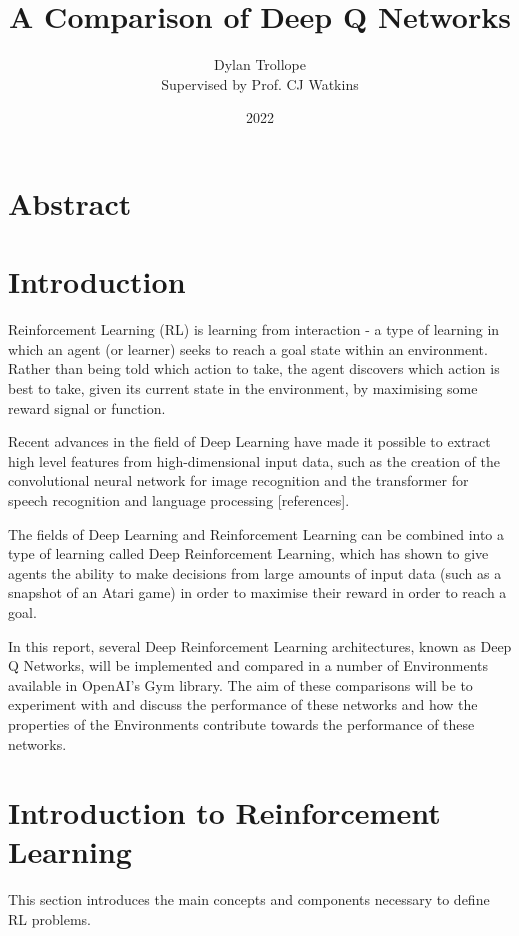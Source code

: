 \documentclass{article}
\title{A Comparison of Deep Q Networks}
\author{Dylan Trollope \\\small Supervised by Prof. CJ Watkins}
\date{2022}
\begin{document}
\maketitle

\section{Abstract}
\newpage
\tableofcontents



\section{Introduction}

Reinforcement Learning (RL) is learning from interaction - a type of learning in which an agent (or learner) seeks to reach a goal state within an environment. Rather than being told which action to take, the agent discovers which action is best to take, given its current state in the environment, by maximising some reward signal or function. 

Recent advances in the field of Deep Learning have made it possible to extract high level features from high-dimensional input data, such as the creation of the convolutional neural network for image recognition and the transformer for speech recognition and language processing [references].

The fields of Deep Learning and Reinforcement Learning can be combined into a type of learning called Deep Reinforcement Learning, which has shown to give agents the ability to make decisions from large amounts of input data (such as a snapshot of an Atari game) in order to maximise their reward in order to reach a goal\cite{mnih2013atari}. 

In this report, several Deep Reinforcement Learning architectures, known as Deep Q Networks, will be implemented and compared in a number of Environments available in OpenAI's Gym library. The aim of these comparisons will be to experiment with and discuss the performance of these networks and how the properties of the Environments  contribute towards the performance of these networks.

\newpage


\section{Introduction to Reinforcement Learning}

This section introduces the main concepts and components necessary to define RL problems. 
\end{document}
